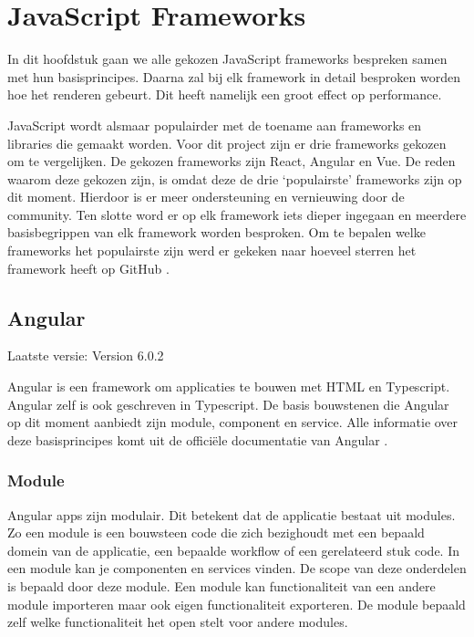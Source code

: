 \section{JavaScript Frameworks}
\label{sec:JavaScript_Frameworks}

In dit hoofdstuk gaan we alle gekozen JavaScript frameworks bespreken samen met hun basisprincipes. Daarna zal bij elk framework in detail besproken worden hoe het renderen gebeurt. Dit heeft namelijk een groot effect op performance.

JavaScript wordt alsmaar populairder met de toename aan frameworks en libraries die gemaakt worden. Voor dit project zijn er drie frameworks gekozen om te vergelijken. De gekozen frameworks zijn React, Angular en Vue. De reden waarom deze gekozen zijn, is omdat deze de drie ‘populairste’ frameworks zijn op dit moment. Hierdoor is er meer ondersteuning en vernieuwing door de community. Ten slotte word er op elk framework iets dieper ingegaan en meerdere basisbegrippen van elk framework worden besproken. Om te bepalen welke frameworks het populairste zijn werd er gekeken naar hoeveel sterren het framework heeft op GitHub \autocite{github_front-end_????}.

\subsection{Angular}
\label{sec:JavaScript_Frameworks_Angular}
Laatste versie: Version 6.0.2

Angular is een framework om applicaties te bouwen met HTML en Typescript. Angular zelf is ook geschreven in Typescript. De basis bouwstenen die Angular op dit moment aanbiedt zijn module, component en service.
Alle informatie over deze basisprincipes komt uit de officiële documentatie van Angular \autocite{_angular_2018}.

\subsubsection{Module}
\label{sec:Angular_Module}
Angular apps zijn modulair. Dit betekent dat de applicatie bestaat uit modules. Zo een module is een bouwsteen code die zich bezighoudt met een bepaald domein van de applicatie, een bepaalde workflow of een gerelateerd stuk code. In een module kan je componenten en services vinden. De scope van deze onderdelen is bepaald door deze module. Een module kan functionaliteit van een andere module importeren maar ook eigen functionaliteit exporteren. De module bepaald zelf welke functionaliteit het open stelt voor andere modules.

